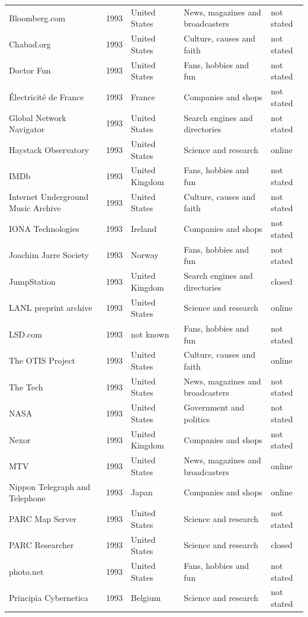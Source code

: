 \documentclass[11pt,a4paper]{article}
\begin{document}
\begin{footnotesize}
\begin{longtable}{p{4.6cm}rp{2.8cm}p{4.3cm}l}
Bloomberg.com & 1993 & United States & News, magazines and broadcasters & not stated\\
Chabad.org & 1993 & United States & Culture, causes and faith & not stated\\
Doctor Fun & 1993 & United States & Fans, hobbies and fun & not stated\\
Électricité de France & 1993 & France & Companies and shops & not stated\\
Global Network Navigator & 1993 & United States & Search engines and directories & not stated\\
Haystack Observatory & 1993 & United States & Science and research & online\\
IMDb & 1993 & United Kingdom & Fans, hobbies and fun & not stated\\
Internet Underground Music Archive & 1993 & United States & Culture, causes and faith & not stated\\
IONA Technologies & 1993 & Ireland & Companies and shops & not stated\\
Joachim Jarre Society & 1993 & Norway & Fans, hobbies and fun & not stated\\
JumpStation & 1993 & United Kingdom & Search engines and directories & closed\\
LANL preprint archive & 1993 & United States & Science and research & online\\
LSD.com & 1993 & not known & Fans, hobbies and fun & not stated\\
The OTIS Project & 1993 & United States & Culture, causes and faith & online\\
The Tech & 1993 & United States & News, magazines and broadcasters & not stated\\
NASA & 1993 & United States & Government and politics & not stated\\
Nexor & 1993 & United Kingdom & Companies and shops & not stated\\
MTV & 1993 & United States & News, magazines and broadcasters & online\\
Nippon Telegraph and Telephone & 1993 & Japan & Companies and shops & online\\
PARC Map Server & 1993 & United States & Science and research & not stated\\
PARC Researcher & 1993 & United States & Science and research & closed\\
photo.net & 1993 & United States & Fans, hobbies and fun & not stated\\
Principia Cybernetica & 1993 & Belgium & Science and research & not stated\\

\end{longtable}
\end{footnotesize}
\end{document}
